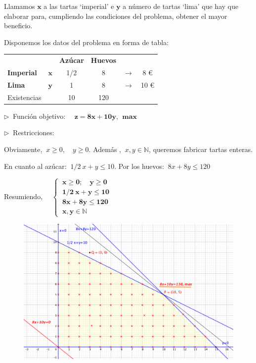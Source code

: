 	
Llamamos $\boldsymbol{x}$ a las tartas `imperial' e $\boldsymbol{y}$ a número de tartas `lima' que hay que elaborar para, cumpliendo las condiciones del problema, obtener el mayor beneficio.

Disponemos los datos del problema en forma de tabla:

\begin{table}[H]
\centering
\begin{tabular}{lccccc}
\multicolumn{1}{c}{\textbf{}} & \textbf{} & \textbf{Azúcar} & \textbf{Huevos} & \textbf{} & \textbf{} \\
\textbf{Imperial} & $\boldsymbol{x}$ & 1/2 & 8 & $\to$ & 8 \euro \\
\textbf{Lima} & $\boldsymbol{y}$ & 1 & 8 & $\to$ & 10 \euro \\ \cline{1-4}
Existencias & \multicolumn{1}{l}{} & 10 & 120 &  & 
\end{tabular}
\end{table}

$\triangleright\ $ Función objetivo: $\quad \boldsymbol{ z=8x+10y,\ \ max }$

$\triangleright\ $ Restricciones:

Obviamente, $\ x\ge 0,\quad y\ge 0$. Además , $\ x,y \in \mathbb N$, queremos fabricar tartas enteras.

En cuanto al azúcar: $\ 1/2 \ x+y\le 10$. Por los huevos: $\ 8x+8y\le 120$

Resumiendo, $\quad \boldsymbol{
	\begin{cases}
 		\ x\ge 0;\quad y\ge 0 \\
 		\ 1/2\ x + y \le 10 \\
 		\ 8x+8y\le 120\\
 		\ x,y \in \mathbb N
	\end{cases}}$

	
\vspace{7mm}
\begin{figure}[H]
	\centering
	\includegraphics[width=1\textwidth]{imagenes/img27.png}
\end{figure}
\vspace{7mm}	
		
